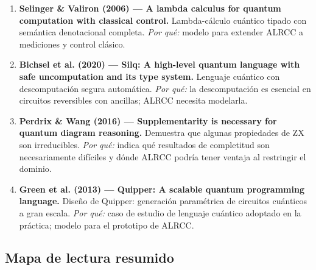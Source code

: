 \documentclass[12pt, a4paper]{article}
\begin{document}
\begin{enumerate}[resume]
  \item \textbf{Selinger \& Valiron (2006) --- A lambda calculus for quantum computation with classical control.}
        Lambda-cálculo cuántico tipado con semántica denotacional completa.
        \textit{Por qué:} modelo para extender ALRCC a mediciones y control clásico.

  \item \textbf{Bichsel et al. (2020) --- Silq: A high-level quantum language with safe uncomputation and its type system.}
        Lenguaje cuántico con descomputación segura automática.
        \textit{Por qué:} la descomputación es esencial en circuitos
        reversibles con ancillas; ALRCC necesita modelarla.

  \item \textbf{Perdrix \& Wang (2016) --- Supplementarity is necessary for quantum diagram reasoning.}
        Demuestra que algunas propiedades de ZX son irreducibles.
        \textit{Por qué:} indica qué resultados de completitud son
        necesariamente difíciles y dónde ALRCC podría tener ventaja al
        restringir el dominio.

  \item \textbf{Green et al. (2013) --- Quipper: A scalable quantum programming language.}
        Diseño de Quipper: generación paramétrica de circuitos cuánticos
        a gran escala.
        \textit{Por qué:} caso de estudio de lenguaje cuántico adoptado
        en la práctica; modelo para el prototipo de ALRCC.
\end{enumerate}

\subsection*{Mapa de lectura resumido}
\end{document}
